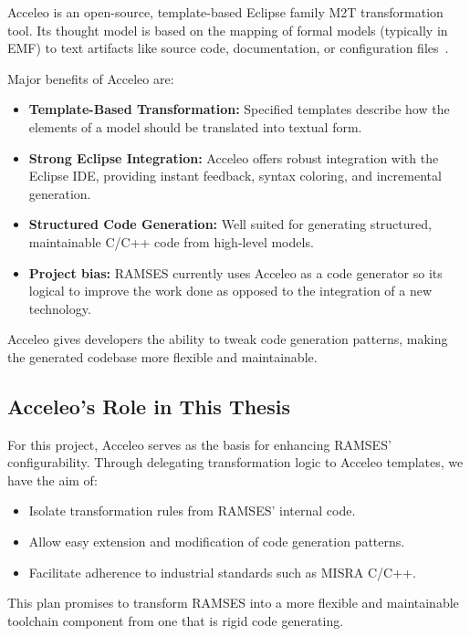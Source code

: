 Acceleo is an open-source, template-based Eclipse family \gls{M2T} transformation tool. Its thought model is based on the mapping of formal models (typically in \gls{EMF}) to text artifacts like source code, documentation, or configuration files~\cite{AcceleoUserGuide}.

Major benefits of Acceleo are: 
\begin{itemize} 
	\item \textbf{Template-Based Transformation:} Specified templates describe how the elements of a model should be translated into textual form.
	\item \textbf{Strong Eclipse Integration:} Acceleo offers robust integration with the Eclipse IDE, providing instant feedback, syntax coloring, and incremental generation.
	\item \textbf{Structured Code Generation:} Well suited for generating structured, maintainable C/C++ code from high-level models.
	\item \textbf{Project bias:} \gls{RAMSES} currently uses Acceleo as a code generator so its logical to improve the work done as opposed to the integration of a new technology.
\end{itemize}

\begin{tcolorbox}[colback=blue!5, colframe=blue!40!black] Acceleo gives developers the ability to tweak code generation patterns, making the generated codebase more flexible and maintainable. \end{tcolorbox}

\subsection*{Acceleo’s Role in This Thesis}

For this project, Acceleo serves as the basis for enhancing \gls{RAMSES}' configurability. Through delegating transformation logic to Acceleo templates, we have the aim of: 
\begin{itemize} 
	\item Isolate transformation rules from \gls{RAMSES}' internal code.
	\item Allow easy extension and modification of code generation patterns.
	\item Facilitate adherence to industrial standards such as \gls{MISRA} C/C++.
\end{itemize}

This plan promises to transform \gls{RAMSES} into a more flexible and maintainable toolchain component from one that is rigid code generating.


